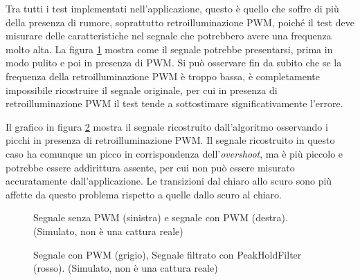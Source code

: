 Tra tutti i test implementati nell'applicazione, questo è quello che soffre di più della presenza di rumore, soprattutto retroilluminazione PWM, poiché il test deve misurare delle caratteristiche nel segnale che potrebbero avere una frequenza molto alta. La figura \ref{fig:pixelOverdriveTest_example1} mostra come il segnale potrebbe presentarsi, prima in modo pulito e poi in presenza di PWM. Si può osservare fin da subito che se la frequenza della retroilluminazione PWM è troppo bassa, è completamente impossibile ricostruire il segnale originale, per cui in presenza di retroilluminazione PWM il test tende a sottostimare significativamente l'errore.

Il grafico in figura \ref{fig:pixelOverdriveTest_example2} mostra il segnale ricostruito dall'algoritmo osservando i picchi in presenza di retroilluminazione PWM. Il segnale ricostruito in questo caso ha comunque un picco in corrispondenza dell'\textit{overshoot}, ma è più piccolo e potrebbe essere addirittura assente, per cui non può essere misurato accuratamente dall'applicazione. Le transizioni dal chiaro allo scuro sono più affette da questo problema rispetto a quelle dallo scuro al chiaro.

\begin{figure}[H]
	\centering
	\caption{Segnale senza PWM (sinistra) e segnale con PWM (destra). (Simulato, non è una cattura reale)}
	\label{fig:pixelOverdriveTest_example1}
\end{figure}

\begin{figure}[H]
	\centering
	\caption{Segnale con PWM (grigio), Segnale filtrato con PeakHoldFilter (rosso). (Simulato, non è una cattura reale)}
	\label{fig:pixelOverdriveTest_example2}
\end{figure}

